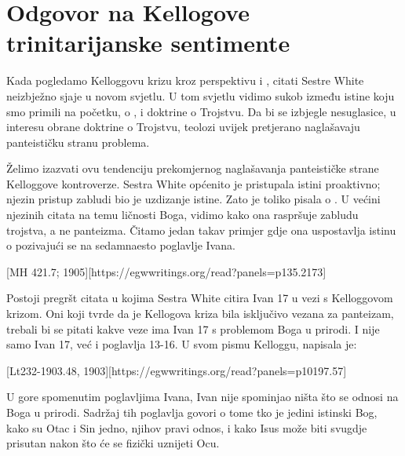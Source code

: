\chapter{Odgovor na Kellogove trinitarijanske sentimente}

Kada pogledamo Kelloggovu krizu kroz perspektivu  i , citati Sestre White neizbježno sjaje u novom svjetlu. U tom svjetlu vidimo sukob između istine koju smo primili na početku, o , i doktrine o Trojstvu. Da bi se izbjegle nesuglasice, u interesu obrane doktrine o Trojstvu, teolozi uvijek pretjerano naglašavaju panteističku stranu problema.

Želimo izazvati ovu tendenciju prekomjernog naglašavanja panteističke strane Kelloggove kontroverze. Sestra White općenito je pristupala istini proaktivno; njezin pristup zabludi bio je uzdizanje istine. Zato je toliko pisala o . U većini njezinih citata na temu ličnosti Boga, vidimo kako ona raspršuje zabludu trojstva, a ne panteizma. Čitamo jedan takav primjer gdje ona uspostavlja istinu o  pozivajući se na sedamnaesto poglavlje Ivana.

[MH 421.7; 1905][https://egwwritings.org/read?panels=p135.2173]

Postoji pregršt citata u kojima Sestra White citira Ivan 17 u vezi s Kelloggovom krizom. Oni koji tvrde da je Kellogova kriza bila isključivo vezana za panteizam, trebali bi se pitati kakve veze ima Ivan 17 s problemom Boga u prirodi. I nije samo Ivan 17, već i poglavlja 13-16. U svom pismu Kelloggu, napisala je:

[Lt232-1903.48, 1903][https://egwwritings.org/read?panels=p10197.57]

U gore spomenutim poglavljima Ivana, Ivan nije spominjao ništa što se odnosi na Boga u prirodi. Sadržaj tih poglavlja govori o tome tko je jedini istinski Bog, kako su Otac i Sin jedno, njihov pravi odnos, i kako Isus može biti svugdje prisutan nakon što će se fizički uznijeti Ocu.

